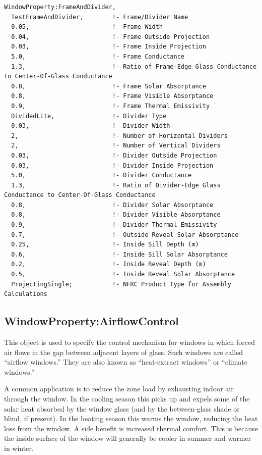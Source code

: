 \begin{lstlisting}
WindowProperty:FrameAndDivider,
  TestFrameAndDivider,        !- Frame/Divider Name
  0.05,                       !- Frame Width
  0.04,                       !- Frame Outside Projection
  0.03,                       !- Frame Inside Projection
  5.0,                        !- Frame Conductance
  1.3,                        !- Ratio of Frame-Edge Glass Conductance to Center-Of-Glass Conductance
  0.8,                        !- Frame Solar Absorptance
  0.8,                        !- Frame Visible Absorptance
  0.9,                        !- Frame Thermal Emissivity
  DividedLite,                !- Divider Type
  0.03,                       !- Divider Width
  2,                          !- Number of Horizontal Dividers
  2,                          !- Number of Vertical Dividers
  0.03,                       !- Divider Outside Projection
  0.03,                       !- Divider Inside Projection
  5.0,                        !- Divider Conductance
  1.3,                        !- Ratio of Divider-Edge Glass Conductance to Center-Of-Glass Conductance
  0.8,                        !- Divider Solar Absorptance
  0.8,                        !- Divider Visible Absorptance
  0.9,                        !- Divider Thermal Emissivity
  0.7,                        !- Outside Reveal Solar Absorptance
  0.25,                       !- Inside Sill Depth (m)
  0.6,                        !- Inside Sill Solar Absorptance
  0.2,                        !- Inside Reveal Depth (m)
  0.5,                        !- Inside Reveal Solar Absorptance
  ProjectingSingle;           !- NFRC Product Type for Assembly Calculations
\end{lstlisting}

\subsection{WindowProperty:AirflowControl}\label{windowpropertyairflowcontrol}

This object is used to specify the control mechanism for windows in which forced air flows in the gap between adjacent layers of glass. Such windows are called ``airflow windows.'' They are also known as ``heat-extract windows'' or ``climate windows.''

A common application is to reduce the zone load by exhausting indoor air through the window. In the cooling season this picks up and expels some of the solar heat absorbed by the window glass (and by the between-glass shade or blind, if present). In the heating season this warms the window, reducing the heat loss from the window. A side benefit is increased thermal comfort. This is because the inside surface of the window will generally be cooler in summer and warmer in winter.

